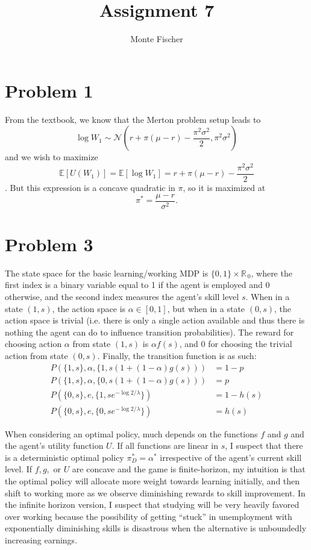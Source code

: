\documentclass{article}
\title{Assignment 7}
\author{Monte Fischer}
\begin{document}
\maketitle

\section*{Problem 1}

From the textbook, we know that the Merton problem setup leads to
\begin{equation}
    \log W_1 \sim \mathcal{N} \left( r+\pi(\mu-r)-\frac{\pi^2 \sigma^2}{2}, \pi^2 \sigma^2  \right)
\end{equation}
and we wish to maximize $$\mathbb{E}[U(W_1)] = \mathbb{E}[\log W_1] = r+\pi(\mu-r)-\frac{\pi^2 \sigma^2}{2}$$. 
But this expression is a concave quadratic in $\pi$, so it is maximized at $$\pi^* = \frac{\mu-r}{\sigma^2}.$$ 

\section*{Problem 3}
The state space for the basic learning/working MDP is $\{0,1\}\times\mathbb{R}_{\>0}$, where the first index is a binary variable equal to 1 if the agent is employed and 0 otherwise, and the second index measures the agent's skill level $s$. When in a state $(1,s)$, the action space is $\alpha\in[0,1]$, but when in a state $(0,s)$, the action space is trivial (i.e. there is only a single action available and thus there is nothing the agent can do to influence transition probabilities). The reward for choosing action $\alpha$ from state $(1,s)$ is $\alpha f(s)$, and 0 for choosing the trivial action from state $(0, s)$. Finally, the transition function is as such:
\begin{align*}
    P(\{1, s\}, \alpha, \{1, s(1+(1-\alpha)g(s))) &= 1-p\\
    P(\{1, s\}, \alpha, \{0, s(1+(1-\alpha)g(s))) &= p\\
    P(\{0, s\}, e, \{1, s e^{-\log{2}/\lambda} \}) &= 1-h(s)\\
    P(\{0, s\}, e, \{0, s e^{-\log{2}/\lambda} \}) &= h(s)
\end{align*}

When considering an optimal policy, much depends on the functions $f$ and $g$ and the agent's utility function $U$. If all functions are linear in $s$, I suspect that there is a deterministic optimal policy $\pi_D^* = \alpha^*$ irrespective of the agent's current skill level. If $f, g,$ or $U$ are concave and the game is finite-horizon, my intuition is that the optimal policy will allocate more weight towards learning initially, and then shift to working more as we observe diminishing rewards to skill improvement. In the infinite horizon version, I suspect that studying will be very heavily favored over working because the possibility of getting ``stuck'' in unemployment with exponentially diminishing skills is disastrous when the alternative is unboundedly increasing earnings.
\end{document}
